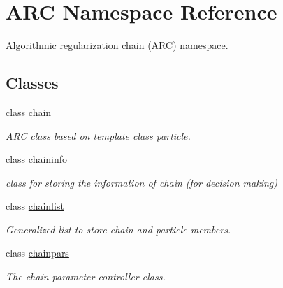 \hypertarget{namespaceARC}{}\section{A\+RC Namespace Reference}
\label{namespaceARC}


Algorithmic regularization chain (\hyperlink{namespaceARC}{A\+RC}) namespace.  


\subsection*{Classes}
\begin{DoxyCompactItemize}
\item 
class \hyperlink{classARC_1_1chain}{chain}
\begin{DoxyCompactList}\small\item\em \hyperlink{namespaceARC}{A\+RC} class based on template class particle. \end{DoxyCompactList}\item 
class \hyperlink{classARC_1_1chaininfo}{chaininfo}
\begin{DoxyCompactList}\small\item\em class for storing the information of chain (for decision making) \end{DoxyCompactList}\item 
class \hyperlink{classARC_1_1chainlist}{chainlist}
\begin{DoxyCompactList}\small\item\em Generalized list to store chain and particle members. \end{DoxyCompactList}\item 
class \hyperlink{classARC_1_1chainpars}{chainpars}
\begin{DoxyCompactList}\small\item\em The chain parameter controller class. \end{DoxyCompactList}\end{DoxyCompactItemize}
